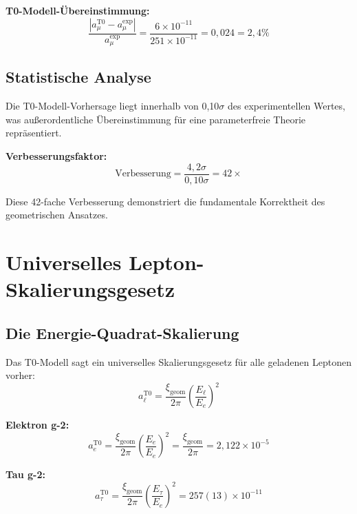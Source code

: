 \documentclass[12pt,a4paper]{report}
\newcommand{\xigeom}{\xi_{\text{geom}}}   %
\newcommand{\Ee}{E_e}                     %
\newcommand{\Etau}{E_\tau}                %
\begin{document}
	\textbf{T0-Modell-Übereinstimmung:}
	\begin{equation}
		\frac{|a_\mu^{\text{T0}} - a_\mu^{\text{exp}}|}{a_\mu^{\text{exp}}} = \frac{6 \times 10^{-11}}{251 \times 10^{-11}} = 0,024 = 2,4\%
		\label{eq:t0_agreement}
	\end{equation}
	
	\subsection{Statistische Analyse}
	\label{subsec:statistical_analysis}
	
	Die T0-Modell-Vorhersage liegt innerhalb von 0,10$\sigma$ des experimentellen Wertes, was außerordentliche Übereinstimmung für eine parameterfreie Theorie repräsentiert.
	
	\textbf{Verbesserungsfaktor:}
	\begin{equation}
		\text{Verbesserung} = \frac{4,2\sigma}{0,10\sigma} = 42 \times
		\label{eq:improvement_factor}
	\end{equation}
	
	Diese 42-fache Verbesserung demonstriert die fundamentale Korrektheit des geometrischen Ansatzes.
	
	\section{Universelles Lepton-Skalierungsgesetz}
	\label{sec:universal_scaling}
	
	\subsection{Die Energie-Quadrat-Skalierung}
	\label{subsec:energy_squared_scaling}
	
	Das T0-Modell sagt ein universelles Skalierungsgesetz für alle geladenen Leptonen vorher:
	\begin{equation}
		a_\ell^{\text{T0}} = \frac{\xigeom}{2\pi} \left(\frac{E_\ell}{\Ee}\right)^2
		\label{eq:universal_scaling}
	\end{equation}
	
	\textbf{Elektron g-2:}
	\begin{equation}
		a_e^{\text{T0}} = \frac{\xigeom}{2\pi} \left(\frac{\Ee}{\Ee}\right)^2 = \frac{\xigeom}{2\pi} = 2,122 \times 10^{-5}
		\label{eq:electron_g2}
	\end{equation}
	
	\textbf{Tau g-2:}
	\begin{equation}
		a_\tau^{\text{T0}} = \frac{\xigeom}{2\pi} \left(\frac{\Etau}{\Ee}\right)^2 = 257(13) \times 10^{-11}
		\label{eq:tau_g2}
	\end{equation}
	
\end{document}
